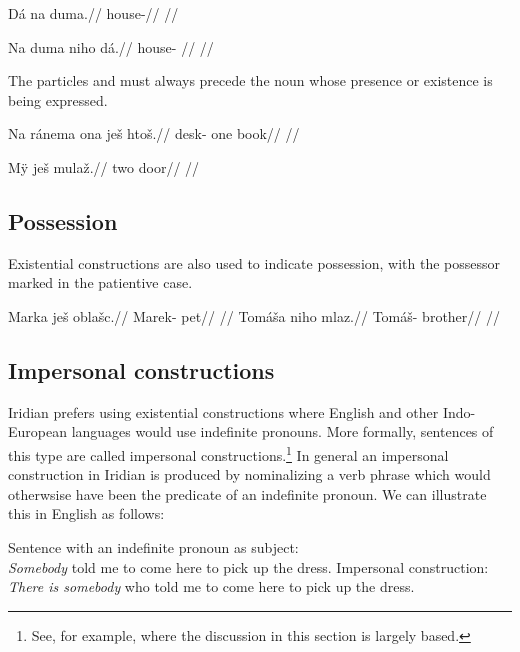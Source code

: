 \pex
\begingl
\gla Dá na duma.//
\glb {} \Loc{} house-\Pat{}//
\glft {}//
\endgl
\xe

\pex
\begingl
\gla Na duma niho dá.//
\glb \Loc{} house-\Pat{} \N{}\Exst{} //
\glft {}//
\endgl
\xe

The particles  and  must always precede the noun whose presence or existence is being expressed.

\pex
\begingl
\gla Na ránema ona ješ htoš.//
\glb \Loc{} desk- one \Exst{} book//
\glft {}//
\endgl
\xe

\pex
\begingl
\gla M\"y ješ mulaž.//
\glb two \Exst{} door//
\glft {}//
\endgl
\xe



\subsection{Possession}
Existential constructions are also used to indicate possession, with the possessor marked in the patientive case.

\begin{multicols}{2}
\pex
  \begingl
    \gla Marka ješ oblašc.//
    \glb Marek-\Pat{} \Exst{} pet//
    \glft {}//
  \endgl
\xe
\pex
  \begingl
    \gla Tomáša niho mlaz.//
    \glb Tomáš-\Pat{} \N{}\Exst{} brother//
    \glft {}//
  \endgl
\xe
\end{multicols}

\subsection{Impersonal constructions}

Iridian prefers using existential constructions where English and other Indo-European languages would use indefinite pronouns. More formally, sentences of this type are called impersonal constructions.\footnote{See, for example, \textcite{lawtagalog} where the discussion in this section is largely based.} In general an impersonal construction in Iridian is produced by nominalizing a verb phrase which would otherwsise have been the predicate of an indefinite pronoun. We can illustrate this in English as follows:

\pex
\a  {}Sentence with an indefinite pronoun as subject:\\
    \emph{Somebody} told me to come here to pick up the dress.
\a  Impersonal construction:\\
    \emph{There is somebody} who told me to come here to pick up the dress.
\xe

